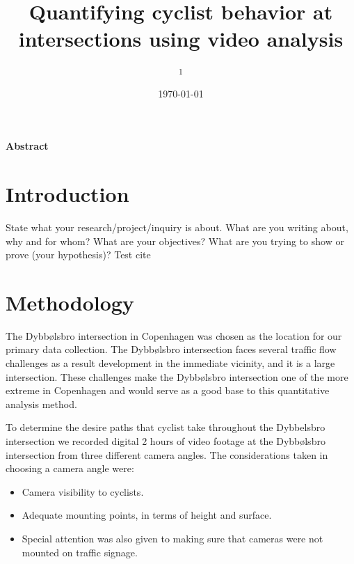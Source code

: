 \documentclass[10pt, a4paper, twocolumn]{article} %
\title{Quantifying cyclist behavior at intersections using video analysis} %
\author{
	\authorstyle{Edi Bergovic\textsuperscript{1} and Høgni Jacobsen\textsuperscript{1}} %
	\newline\newline %
	\textsuperscript{1}\institution{The IT University of Copenhagen, Copenhagen, Denmark}\\ %
}
\date{\today} %
\begin{document}
\maketitle %

\thispagestyle{firstpage} %


\textbf{Abstract}


\section{Introduction}

State what your research/project/inquiry is about. What are you writing about, why and for whom? What are your objectives? 
What are you trying to show or prove (your hypothesis)? Test cite \citep{Reference1}


\section{Methodology}

The Dybbølsbro intersection in Copenhagen was chosen as the location for our primary data collection. 
The Dybbølsbro intersection faces several traffic flow challenges as a result development in the immediate vicinity, and it is a large intersection.
These challenges make the Dybbølsbro intersection one of the more extreme in Copenhagen and would serve as a good base to this quantitative analysis method. 

To determine the desire paths that cyclist take throughout the Dybbelsbro intersection we recorded digital 2 hours of video footage 
at the Dybbølsbro intersection from three different camera angles.
The considerations taken in choosing a camera angle were:

\begin{itemize}
	\item Camera visibility to cyclists.
	\item Adequate mounting points, in terms of height and surface.
	\item Special attention was also given to making sure that cameras were not mounted on traffic signage.
\end{itemize}
\end{document}

